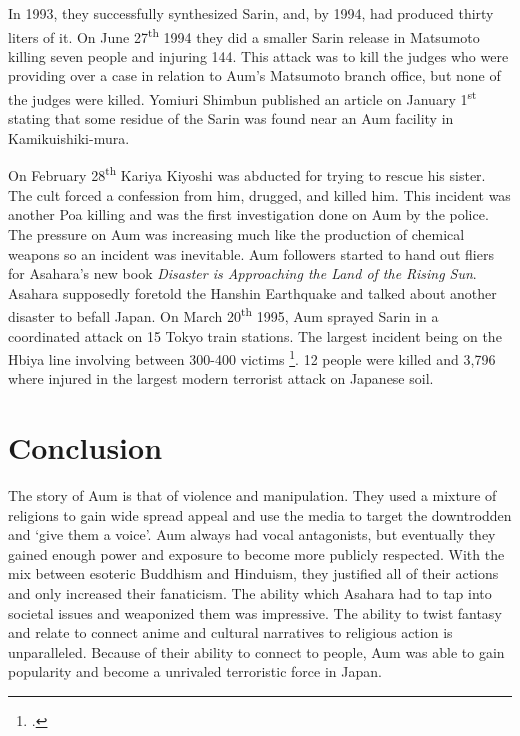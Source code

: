 \documentclass[12pt, letterpaper]{article}
\newcommand{\sorta}[1]{`#1'}
\newcommand{\poses}[1]{#1's}
\begin{document}
In 1993, they successfully synthesized Sarin, and, by 1994, had
produced thirty liters of it. On June 27\textsuperscript{th} 1994 they did a smaller Sarin release in
Matsumoto killing seven people and injuring 144. This attack was to kill the judges who were providing over a
case in relation to \poses{Aum} Matsumoto branch office, but none of the judges were killed. 
Yomiuri Shimbun published an article on January 1\textsuperscript{st} stating
that some residue of the Sarin was found near an Aum facility in Kamikuishiki-mura.

On February 28\textsuperscript{th} Kariya Kiyoshi was abducted for trying to rescue his sister. 
The cult forced a confession from him, drugged, and killed him. This incident was another Poa killing
and was the first investigation done on Aum by the police. The pressure on Aum was increasing much like the
production of chemical weapons so an incident was inevitable. Aum
followers started to hand out fliers for \poses{Asahara} new book \textit{Disaster is Approaching the Land 
  of the Rising Sun}. Asahara supposedly foretold the Hanshin Earthquake and talked about another
disaster to befall Japan. On March 20\textsuperscript{th} 1995, Aum sprayed Sarin in a
coordinated attack on 15 Tokyo train stations. The largest incident being on the Hbiya line involving between
300-400 victims \footcite[513]{olson_aum_1999}. 12 people were killed and 3,796 where injured in the
largest modern terrorist attack on Japanese soil.

\section{Conclusion}
The story of Aum is that of violence and manipulation. They used a mixture of religions to gain wide spread
appeal and use the media to target the downtrodden and \sorta{give them a voice}. Aum always had vocal
antagonists, but eventually they gained enough power and exposure to become more publicly respected. With the
mix between esoteric Buddhism and Hinduism, they justified all of their actions and only increased their
fanaticism. The ability which Asahara had to tap into societal issues and weaponized them was impressive. The
ability to twist fantasy and relate to connect anime and cultural narratives to religious action is
unparalleled. Because of their ability to connect to people, Aum was able to gain popularity and become a
unrivaled terroristic force in Japan.
\end{document}
